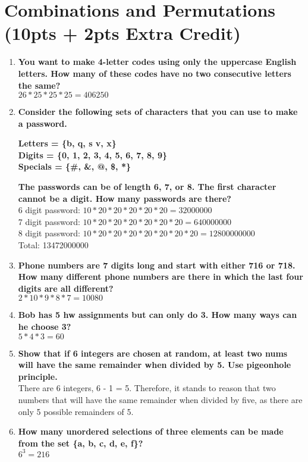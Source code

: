 \documentclass[a4paper]{article}
\begin{document}
\section{Combinations and Permutations (10pts + 2pts Extra Credit)}
\begin{enumerate}
    \item \textbf{You want to make 4-letter codes using only the uppercase English letters. How many of these codes have no two consecutive letters the same?}\\
    $26 * 25 * 25 * 25 = 406250$
    \item \textbf{Consider the following sets of characters that you can use to make a password.}
    
    \textbf{Letters = \{b, q, s v, x\}} \\
    \textbf{Digits = \{0, 1, 2, 3, 4, 5, 6, 7, 8, 9\}}\\
    \textbf{Specials = \{\#, \&, @, \$, *\}}
    
    \textbf{The passwords can be of length 6, 7, or 8. The first character cannot be a digit. How many passwords are there?}\\
    6 digit password: $10 * 20 * 20 * 20 * 20 * 20 = 32000000$\\
    7 digit password: $10 * 20 * 20 * 20 * 20 * 20 * 20 = 640000000$\\
    8 digit password: $10 * 20 * 20 * 20 * 20 * 20 * 20 * 20 = 12800000000$\\
    Total: 13472000000
    \item \textbf{Phone numbers are 7 digits long and start with either 716 or 718. How many different phone numbers are there in which the last four digits are all different?}\\
    $2 * 10 * 9 * 8 * 7 = 10080$
    \item \textbf{Bob has 5 hw assignments but can only do 3. How many ways can he choose 3?}\\
    $5 * 4 * 3 = 60$
    \item \textbf{Show that if 6 integers are chosen at random, at least two nums will have the same remainder when divided by 5. Use pigeonhole principle.}\\
    There are 6 integers, 6 - 1 = 5. Therefore, it stands to reason that two numbers that will have the same remainder when divided by five, as there are only 5 possible remainders of 5.
    \item \textbf{How many unordered selections of three elements can be made from the set \{a, b, c, d, e, f\}?}\\
    $6^3 = 216$
\end{enumerate}
\end{document}
